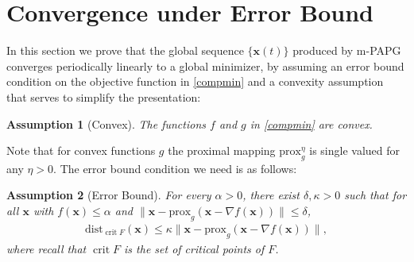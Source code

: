 \documentclass[leqno,onefignum,onetabnum]{siamart0516}
\newtheorem{assum}{Assumption}
\newcommand{\xb}{\mathbf{x}}
\newcommand{\yb}{\mathbf{y}}
\newcommand{\dist}{\mathrm{dist}}
\newcommand{\prox}[2][\eta]{\mathrm{prox}_{#2}^{#1}}
\newcommand{\crit}{\mathop{\mathrm{crit}}}
\newcommand{\mspg}{\textsf{m-PAPG}\xspace}
\begin{document}

\section{Convergence under Error Bound}\label{sec: EB}
In this section we prove that the global sequence $\{\xb(t)\}$ produced by \mspg converges periodically linearly to a global minimizer, by assuming an error bound condition on the objective function in \eqref{compmin} and a convexity assumption that serves to simplify the presentation:
\begin{assum}[Convex]\label{assum:convex}
	The functions $f$ and $g$ in \eqref{compmin} are convex.
\end{assum}
Note that for convex functions $g$ the proximal mapping $\prox[\eta]{g}$ is single valued for any $\eta > 0$. The error bound condition we need is as follows:
\begin{assum}[Error Bound]\label{assum:eb}
	For every $\alpha > 0$, there exist $\delta ,\kappa>0$ %
	such that for all $\xb$ with $f(\xb) \leq \alpha$ and $\|\xb - \prox[]{g}(\xb - \nabla f(\xb))\| \leq \delta$,
	\begin{align}\label{eq:eb}
	\dist_{\crit F}(\xb) \leq \kappa \|\xb - \prox[]{g}(\xb - \nabla f(\xb))\|,
	\end{align}
	where recall that $\crit F$ is the set of critical points of $F$.
\end{assum}
\end{document}
